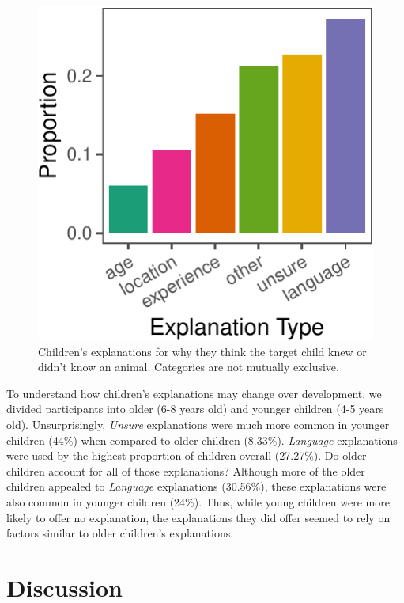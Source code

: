 \documentclass[10pt, letterpaper]{article}
\newenvironment{CodeChunk}{}{}
\begin{document}
\begin{CodeChunk}
\begin{figure}[tb]
\includegraphics{figs/explanations-1} \caption[Children's explanations for why they think the target child knew or didn't know an animal]{Children's explanations for why they think the target child knew or didn't know an animal. Categories are not mutually exclusive.}\label{fig:explanations}
\end{figure}
\end{CodeChunk}

To understand how children's explanations may change over development,
we divided participants into older (6-8 years old) and younger children
(4-5 years old). Unsurprisingly, \emph{Unsure} explanations were much
more common in younger children (44\%) when compared to older children
(8.33\%). \emph{Language} explanations were used by the highest
proportion of children overall (27.27\%). Do older children account for
all of those explanations? Although more of the older children appealed
to \emph{Language} explanations (30.56\%), these explanations were also
common in younger children (24\%). Thus, while young children were more
likely to offer no explanation, the explanations they did offer seemed
to rely on factors similar to older children's explanations.

\hypertarget{discussion}{%
\section{Discussion}\label{discussion}}
\end{document}
